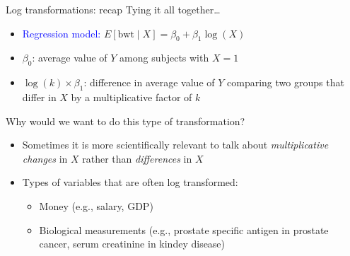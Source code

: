 \documentclass[10pt,t]{beamer}
\begin{document}
\begin{frame}{Log transformations: recap}
Tying it all together\dots

\vspace{0.3cm}

\begin{itemize}
	\item \textcolor{blue}{Regression model:} $E[\text{bwt} \mid X] = \beta_0 + \beta_1 \log(X)$
	\item \color{blue} $\beta_0$\color{black}: average value of $Y$ among subjects with $X = 1$
	\item \color{blue}$\log(k) \times \beta_1$\color{black}: difference in average value of $Y$ comparing two groups that differ in $X$ by a multiplicative factor of $k$
\end{itemize}\pause

\vspace{0.3cm}

Why would we want to do this type of transformation?

\begin{itemize}
	\item Sometimes it is more scientifically relevant to talk about \textit{multiplicative changes} in $X$ rather than \textit{differences} in $X$
	\item Types of variables that are often log transformed:
	\begin{itemize}
		\item Money (e.g., salary, GDP)
		\item Biological measurements (e.g., prostate specific antigen in prostate cancer, serum creatinine in kindey disease)
	\end{itemize}
\end{itemize}
\end{frame}
\end{document}
